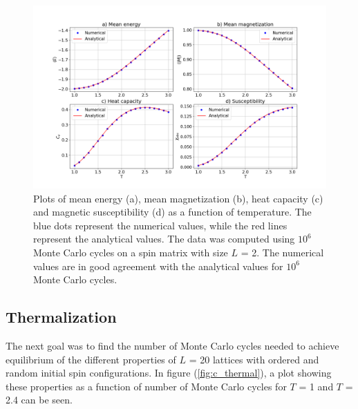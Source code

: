 \documentclass[10pt,a4paper,titlepage]{article}
\begin{document}
\begin{figure}[]
\centering
\centering\includegraphics[scale=0.3]{L2_1E+06.png}
\caption{Plots of mean energy (a), mean magnetization (b), heat capacity (c) and magnetic susceptibility (d) as a function of temperature. The blue dots represent the numerical values, while the red lines represent the analytical values. The data was computed using $10^6$ Monte Carlo cycles on a spin matrix with size $L$ = 2. The numerical values are in good agreement with the analytical values for $10^6$ Monte Carlo cycles. \label{fig:b_Num_vs_Ana}}
\end{figure}






\subsection{Thermalization}
The next goal was to find the number of Monte Carlo cycles needed to achieve equilibrium of the different properties of $L$ = 20 lattices with ordered and random initial spin configurations. In figure (\ref{fig:c_thermal}), a plot showing these properties as a function of number of Monte Carlo cycles for $T$ = 1 and $T$ = 2.4 can be seen. 


	
\end{document}
